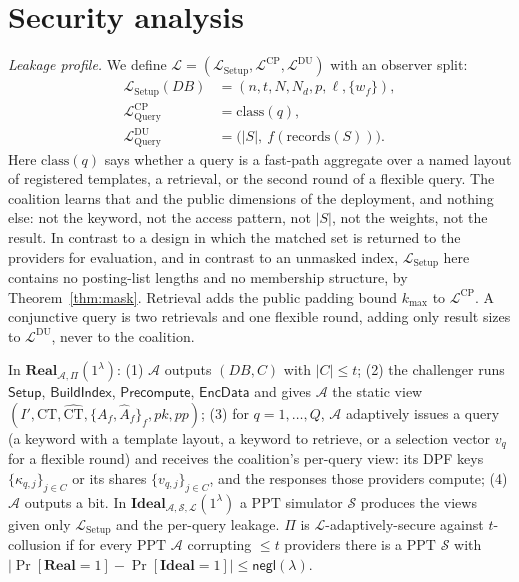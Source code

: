 \documentclass[a4paper,fleqn]{cas-sc}
\newcommand{\negl}{\mathsf{negl}}
\newcommand{\PPT}{\mathrm{PPT}}
\newcommand{\Real}{\mathbf{Real}}
\newcommand{\Ideal}{\mathbf{Ideal}}
\newcommand{\Leak}{\mathcal{L}}
\newcommand{\Sim}{\mathcal{S}}
\newcommand{\Adv}{\mathcal{A}}
\begin{document}
\section{Security analysis}
\label{sec:security}

\emph{Leakage profile.} We define
$\Leak=(\Leak_{\mathrm{Setup}},\Leak^{\text{CP}},\Leak^{\text{DU}})$ with an
observer split:
\begin{align*}
\Leak_{\mathrm{Setup}}(DB) &= (n,t,N,N_d,p,\ell,\{w_f\}),\\
\Leak^{\text{CP}}_{\mathrm{Query}} &= \mathrm{class}(q),\\
\Leak^{\text{DU}}_{\mathrm{Query}} &= \big(|S|,\ f(\mathrm{records}(S))\big).
\end{align*}
Here $\mathrm{class}(q)$ says whether a query is a fast-path aggregate over a
named layout of registered templates, a retrieval, or the second round of a
flexible query. The coalition learns that and the public dimensions of the
deployment, and nothing else: not the keyword, not the access pattern, not
$|S|$, not the weights, not the result. In contrast to a design in which
the matched set is returned to the providers for evaluation, and in contrast
to an unmasked index, $\Leak_{\mathrm{Setup}}$ here contains no posting-list
lengths and no membership structure, by Theorem~\ref{thm:mask}. Retrieval adds
the public padding bound $k_{\max}$ to $\Leak^{\text{CP}}$. A conjunctive
query is two retrievals and one flexible round, adding only result sizes to
$\Leak^{\text{DU}}$, never to the coalition.

\begin{definition}[$\Leak$-security against $t$-collusion]
\label{def:sec}
In $\Real_{\Adv,\Pi}(1^\lambda)$: (1) $\Adv$ outputs $(DB,C)$ with $|C|\le t$;
(2) the challenger runs $\mathsf{Setup}$, $\mathsf{BuildIndex}$,
$\mathsf{Precompute}$, $\mathsf{EncData}$ and gives $\Adv$ the static view
$(I',\text{CT},\widehat{\text{CT}},\{A_f,\widehat A_f\}_f,pk,pp)$;
(3) for $q=1,\dots,Q$, $\Adv$ adaptively issues a query (a keyword with a
template layout, a keyword to retrieve, or a selection vector $v_q$ for a
flexible round) and receives the coalition's per-query view: its DPF keys
$\{\kappa_{q,j}\}_{j\in C}$ or its shares $\{v_{q,j}\}_{j\in C}$, and the
responses those providers compute; (4) $\Adv$
outputs a bit. In $\Ideal_{\Adv,\Sim,\Leak}(1^\lambda)$ a $\PPT$ simulator
$\Sim$ produces the views given only $\Leak_{\mathrm{Setup}}$ and the
per-query leakage. $\Pi$ is $\Leak$-adaptively-secure against $t$-collusion if
for every $\PPT$ $\Adv$ corrupting $\le t$ providers there is a $\PPT$ $\Sim$
with $|\Pr[\Real=1]-\Pr[\Ideal=1]|\le\negl(\lambda)$.
\end{definition}
\end{document}
